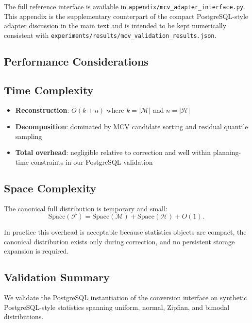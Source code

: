 The full reference interface is available in
\texttt{appendix/\allowbreak mcv\_\allowbreak adapter\_\allowbreak interface.py}. This appendix is the
supplementary counterpart of the compact PostgreSQL-style adapter discussion in
the main text and is intended to be kept numerically consistent with
\texttt{experiments/\allowbreak results/\allowbreak mcv\_\allowbreak validation\_\allowbreak results.json}.

\subsection{Performance Considerations}

\subsection{Time Complexity}

\begin{itemize}
    \item \textbf{Reconstruction}: $O(k + n)$ where $k = |\mathcal{M}|$ and $n = |\mathcal{H}|$
    \item \textbf{Decomposition}: dominated by MCV candidate sorting and residual quantile sampling
    \item \textbf{Total overhead}: negligible relative to correction and well within planning-time constraints in our PostgreSQL validation
\end{itemize}

\subsection{Space Complexity}

The canonical full distribution is temporary and small:
\[
\mathrm{Space}(\mathcal{F}) = \mathrm{Space}(\mathcal{M}) + \mathrm{Space}(\mathcal{H}) + O(1).
\]

In practice this overhead is acceptable because statistics objects are compact,
the canonical distribution exists only during correction, and no persistent
storage expansion is required.

\subsection{Validation Summary}
\label{sec:mcv-eval}

We validate the PostgreSQL instantiation of the conversion interface on
synthetic PostgreSQL-style statistics spanning uniform, normal, Zipfian, and
bimodal distributions.

